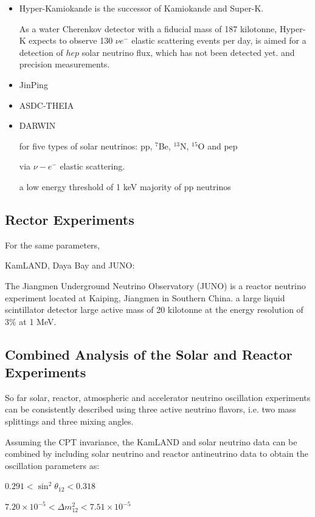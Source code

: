 \begin{itemize}
\item{Hyper-Kamiokande} is the successor of Kamiokande and Super-K. 

As a water Cherenkov detector with a fiducial mass of 187 kilotonne, Hyper-K expects to observe 130 $\nu e^-$ elastic scattering events per day,
is aimed for a detection of $hep$ solar neutrino flux, which has not been detected yet.
 and precision measurements.
\item{JinPing}

\item{ASDC-THEIA}

\item{DARWIN}

for five types of solar neutrinos:
pp, $^7$Be, $^{13}$N, $^{15}$O and pep

via $\nu-e^-$ elastic scattering\cite{aalbers2020solar}. 

a low energy threshold of 1 keV
majority of pp neutrinos
\end{itemize}


\subsection{Rector Experiments}
For the same parameters,

KamLAND, Daya Bay and JUNO:

The Jiangmen Underground Neutrino Observatory (JUNO) is a reactor neutrino experiment located at Kaiping, Jiangmen in Southern China. a large liquid scintillator detector 
large active mass of 20 kilotonne at the energy resolution of 3\% at 1 MeV.
\cite{giaz2018status}


\subsection{Combined Analysis of the Solar and Reactor Experiments}
So far solar, reactor, atmospheric and accelerator neutrino oscillation experiments can be consistently described using three active neutrino flavors, i.e. two mass splittings and three mixing angles.

Assuming the CPT invariance, the KamLAND and solar neutrino data can be combined by including solar neutrino and reactor antineutrino data to obtain the oscillation parameters as\cite{oberauer2020solar}:

$0.291<\sin^2\theta_{12}<0.318$
 
$7.20\times 10^{-5}<\Delta m^2_{12}<7.51\times 10^{-5}$

